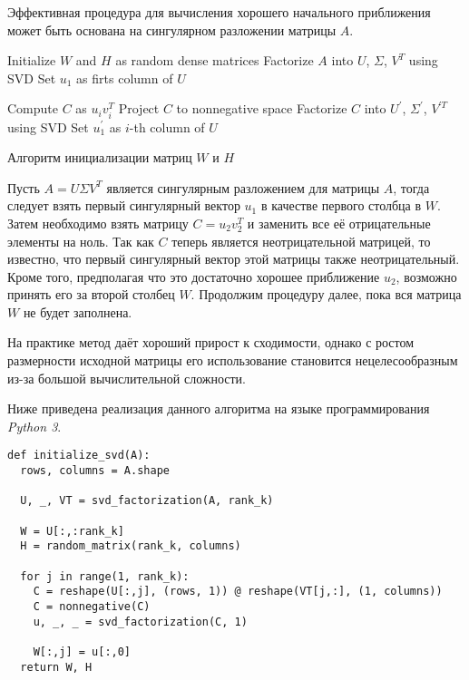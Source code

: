 Эффективная процедура для вычисления хорошего начального приближения может быть основана на сингулярном разложении матрицы $A$.

\begin{algorithm} \label{alg:svd_init}

  \BlankLine
  \BlankLine


  \BlankLine

  Initialize $W$ and $H$ as random dense matrices\;
  Factorize $A$ into $U$, $\Sigma$, $V^T$ using SVD\;
  Set $u_1$ as firts column of $U$\;

   {
    Compute $C$ as $u_i v_i^T$\;
    Project $C$ to nonnegative space\;
    Factorize $C$ into $U^\prime$, $\Sigma^\prime$, $V^{\prime T}$ using SVD\;
    Set $u^\prime_1$ as $i$-th column of $U$\;
  }

  \BlankLine

  \caption{Алгоритм инициализации матриц $W$ и $H$}
\end{algorithm}

Пусть $A = U \Sigma V^T $ является сингулярным разложением для матрицы $A$,
тогда следует взять первый сингулярный вектор $u_1$ в качестве первого столбца в $W$.
Затем необходимо взять матрицу $C = u_2 v_2^T$ и заменить все её отрицательные элементы на ноль.
Так как $C$ теперь является неотрицательной матрицей, то известно, что первый сингулярный вектор этой матрицы также неотрицательный.
Кроме того, предполагая что это достаточно хорошее приближение $u_2$, возможно принять его за второй столбец $W$.
Продолжим процедуру далее, пока вся матрица $W$ не будет заполнена.

На практике метод даёт хороший прирост к сходимости,
однако с ростом размерности исходной матрицы его использование становится
нецелесообразным из-за большой вычислительной сложности.


\newpage

Ниже приведена реализация данного алгоритма на языке программирования \textit{Python 3}.
\\

\begin{lstlisting}[caption=Алгоритм SVD инициализации]
def initialize_svd(A):
  rows, columns = A.shape

  U, _, VT = svd_factorization(A, rank_k)

  W = U[:,:rank_k]
  H = random_matrix(rank_k, columns)

  for j in range(1, rank_k):
    C = reshape(U[:,j], (rows, 1)) @ reshape(VT[j,:], (1, columns))
    C = nonnegative(C)
    u, _, _ = svd_factorization(C, 1)

    W[:,j] = u[:,0]
  return W, H
\end{lstlisting}




